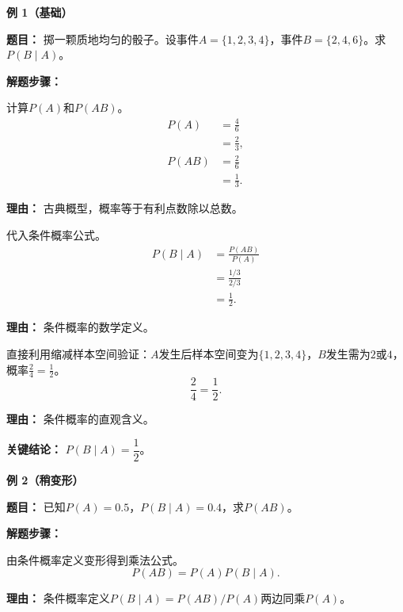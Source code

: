 \begin{examplebox}
	\textbf{\textcolor{CExample}{例 1（基础）}}

	\textbf{\textcolor{CExample}{题目：}}
	掷一颗质地均匀的骰子。设事件$A=\{1,2,3,4\}$，事件$B=\{2,4,6\}$。求$P(B \mid A)$。

	\textbf{\textcolor{CExample}{解题步骤：}}
	\begin{description}[style=nextline, leftmargin=2.8em, labelsep=0.5em, itemsep=0.45em]
		\item[\textbf{第一步（计算基本概率）：}] 计算$P(A)$和$P(AB)$。
			\[
				\begin{aligned}
					P(A) &= \frac{4}{6} \\
					&= \frac{2}{3}, \\
					P(AB) &= \frac{2}{6} \\
					&= \frac{1}{3}.
			\end{aligned}
			\]
			\par\textbf{理由：} 古典概型，概率等于有利点数除以总数。

		\item[\textbf{第二步（套用定义）：}] 代入条件概率公式。
			\[
				\begin{aligned}
					P(B \mid A) &= \frac{P(AB)}{P(A)} \\
					&= \frac{1/3}{2/3} \\
					&= \frac{1}{2}.
			\end{aligned}
			\]
			\par\textbf{理由：} 条件概率的数学定义。

		\item[\textbf{第三步（缩减验证）：}] 直接利用缩减样本空间验证：$A$发生后样本空间变为$\{1,2,3,4\}$，$B$发生需为$2$或$4$，概率$\frac{2}{4}=\frac{1}{2}$。
			\[
				\frac{2}{4}=\frac{1}{2}.
			\]
			\par\textbf{理由：} 条件概率的直观含义。
	\end{description}

	\textbf{\textcolor{CExample}{关键结论：}}
	\textbf{$P(B \mid A)=\dfrac{1}{2}$}。

	\medskip
	\textbf{\textcolor{CExample}{例 2（稍变形）}}

	\textbf{\textcolor{CExample}{题目：}}
	已知$P(A)=0.5$，$P(B \mid A)=0.4$，求$P(AB)$。

	\textbf{\textcolor{CExample}{解题步骤：}}
	\begin{description}[style=nextline, leftmargin=2.8em, labelsep=0.5em, itemsep=0.45em]
		\item[\textbf{第一步（变形公式）：}] 由条件概率定义变形得到乘法公式。
			\[
				P(AB)=P(A)P(B \mid A).
			\]
			\par\textbf{理由：} 条件概率定义$P(B \mid A)=P(AB)/P(A)$两边同乘$P(A)$。


\end{description}
\end{examplebox}
